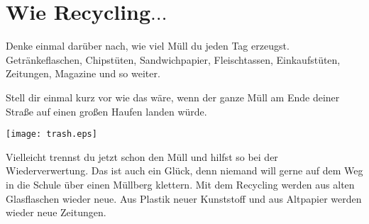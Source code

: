 

\chapter{Wie Recycling$\ldots$}\label{ch:sortoflikerecycling}

Denke einmal darüber nach, wie viel Müll du jeden Tag erzeugst. Getränkeflaschen, Chipstüten, Sandwichpapier, Fleischtassen, Einkaufstüten, Zeitungen, Magazine und so weiter.
\par
Stell dir einmal kurz vor wie das wäre, wenn der ganze Müll am Ende deiner Straße auf einen großen Haufen landen würde.

\begin{center}
\texttt{[image: trash.eps]}
\end{center}

Vielleicht trennst du jetzt schon den Müll und hilfst so bei der Wiederverwertung. Das ist auch ein Glück, denn niemand will gerne auf dem Weg in die Schule über einen Müllberg klettern. Mit dem Recycling werden aus alten Glasflaschen wieder neue. Aus Plastik neuer Kunststoff und aus Altpapier werden wieder neue Zeitungen.

